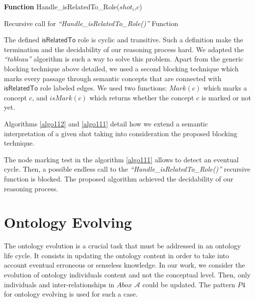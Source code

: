 		
		\begin{algorithm}
			\label{algo111}
			\SetAlgoLined
			\textbf{Function} Handle\_isRelatedTo\_Role($shot_{i}$,$c$)\\
			  {
			}
			\caption{Recursive call for \emph{``Handle\_isRelatedTo\_Role()''} Function}
		\end{algorithm}

The defined $\mathsf{isRelatedTo}$ role is cyclic and transitive. Such a
definition make the  termination and the decidability of our reasoning process hard. We adapted 
the \emph{``tableau''} algorithm is such a way to  solve this problem. 
Apart from the generic blocking technique above detailed, we used a second 
blocking technique which marks every passage through  
semantic concepts that are connected with $\mathsf{isRelatedTo}$ role labeled
edges. We used two functions: $Mark(c)$ which marks a concept $c$, and
$isMark(c)$ which returns whether the concept $c$ is marked or not yet.

Algorithms \ref{algo112} and \ref{algo111} detail how we extend a semantic interpretation of a given
shot taking into consideration the proposed blocking technique. 

The node marking test in the algorithm \ref{algo111} allows to detect an
eventual cycle. Then, a possible endless call to the
\emph{``Handle\_isRelatedTo\_Role()''} recursive function is blocked. 
The proposed algorithm achieved the decidability of our reasoning process.

  


		\section{Ontology Evolving}
		\label{section:evolving}
		The ontology evolution is a crucial task that must be addressed in an ontology life cycle. 
		It consists in updating the ontology content in order to take into account eventual erroneous 
		or senseless knowledge. In our work, we consider the evolution of ontology individuals content 
		and not the conceptual level. Then, only individuals and inter-relationships in $Abox$ $\mathcal{A}$ 
		could be updated. The pattern $P4$ for ontology evolving is used for such a case.
	
